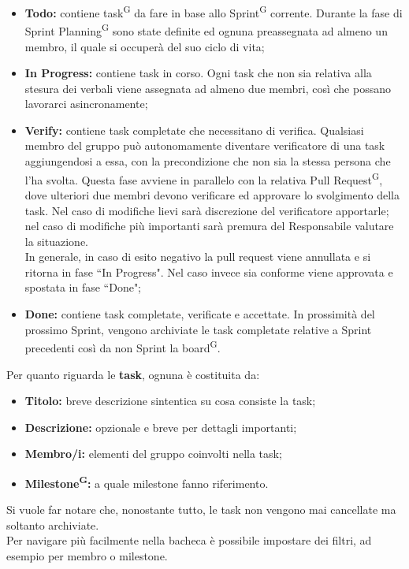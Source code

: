 \documentclass[8pt]{article}
\newcommand{\glossterm}[1]{#1\textsuperscript{G}} %
\begin{document}
\begin{itemize}
    \item \textbf{Todo:} contiene \glossterm{task} da fare in base allo \glossterm{Sprint} corrente. Durante la fase di Sprint \glossterm{Planning} sono state definite ed ognuna preassegnata ad almeno un membro, il quale si occuperà del suo ciclo di vita;
  \item \textbf{In Progress:} contiene task in corso. Ogni task che non sia relativa alla stesura dei verbali viene assegnata ad almeno due membri, così che possano lavorarci asincronamente;
  \item \textbf{Verify:} contiene task completate che necessitano di verifica. Qualsiasi membro del
      gruppo può autonomamente diventare verificatore di una task aggiungendosi a essa, con la
        precondizione che non sia la stessa persona che l'ha svolta. Questa fase avviene in
        parallelo con la relativa \glossterm{Pull Request}, dove ulteriori due membri devono verificare ed
        approvare lo svolgimento della task. Nel caso di modifiche lievi sarà discrezione del
        verificatore apportarle; nel caso di modifiche più importanti sarà premura del Responsabile
        valutare la situazione.\\In generale, in caso di esito negativo la pull request viene
        annullata e si ritorna in fase ``In Progress". Nel caso invece sia conforme viene approvata
        e spostata in fase ``Done";
  \item \textbf{Done:} contiene task completate, verificate e accettate. In prossimità del prossimo
      Sprint, vengono archiviate le task completate relative a Sprint precedenti così da non Sprint la \glossterm{board}.
\end{itemize}
\medskip
Per quanto riguarda le \textbf{task}, ognuna è costituita da:
\begin{itemize}
  \item \textbf{Titolo:} breve descrizione sintentica su cosa consiste la task;
  \item \textbf{Descrizione:} opzionale e breve per dettagli importanti;
  \item \textbf{Membro/i:} elementi del gruppo coinvolti nella task;
  \item \textbf{\glossterm{Milestone}:} a quale milestone fanno riferimento.
\end{itemize}
Si vuole far notare che, nonostante tutto, le task non vengono mai cancellate ma soltanto archiviate. \\Per navigare più facilmente nella bacheca è possibile impostare dei filtri, ad esempio per membro o milestone.
\end{document}
